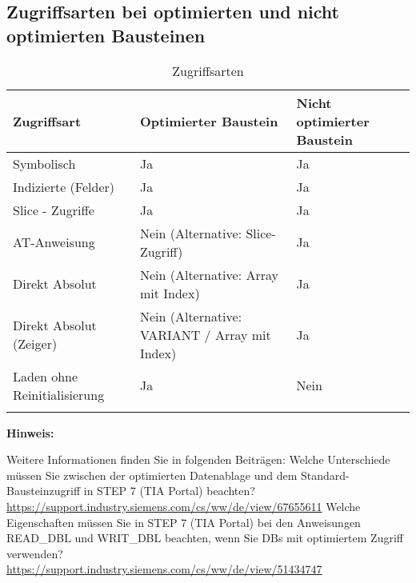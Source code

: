 \clearpage
\subsection{Zugriffsarten bei optimierten und nicht optimierten Bausteinen}\label{subsec:Zugriffsarten bei optimierten und nicht optimierten Bausteinen
}
\begin{longtable}{| p{} | p{} | p{} |} %
    \hline
    \textbf{Zugriffsart} & \textbf{Optimierter Baustein} & \textbf{Nicht optimierter Baustein} \\    
    \hline
    Symbolisch & Ja & Ja\\    
    \hline
    Indizierte (Felder) & Ja & Ja\\
    \hline
    Slice - Zugriffe & Ja & Ja\\
    \hline
    AT-Anweisung & Nein (Alternative: Slice-Zugriff) & Ja\\
    \hline
    Direkt Absolut & Nein (Alternative: Array mit Index) & Ja\\
    \hline
    Direkt Absolut (Zeiger)& Nein (Alternative: VARIANT / Array mit Index) & Ja\\
    \hline
    Laden ohne Reinitialisierung& Ja & Nein\\
    \hline
    \caption{Zugriffsarten}\label{tab:Zugriffsarten} %
\end{longtable}

\noindent \textbf{Hinweis:}\par \noindent
Weitere Informationen finden Sie in folgenden Beiträgen:
Welche Unterschiede müssen Sie zwischen der optimierten Datenablage und dem Standard-Bausteinzugriff in STEP 7 (TIA Portal) beachten? \\
\url{https://support.industry.siemens.com/cs/ww/de/view/67655611}
\noindent 
Welche Eigenschaften müssen Sie in STEP 7 (TIA Portal) bei den Anweisungen 
\glqq READ\_DBL\grqq{} und \glqq WRIT\_DBL\grqq{} beachten, wenn Sie DBs mit optimiertem Zugriff verwenden? \\
\url{https://support.industry.siemens.com/cs/ww/de/view/51434747}


